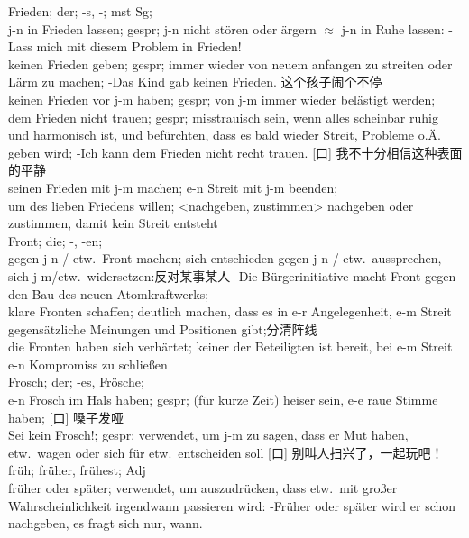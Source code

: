 \noindent
Frieden; der; -s, -; mst Sg; \\
j-n in Frieden lassen; gespr; j-n nicht st\"oren oder \"argern $\approx$ j-n in Ruhe lassen: -Lass mich mit diesem Problem in Frieden! \\
keinen Frieden geben; gespr; immer wieder von neuem anfangen zu streiten oder L\"arm zu machen; -Das Kind gab keinen Frieden. 这个孩子闹个不停\\
keinen Frieden vor j-m haben; gespr; von j-m immer wieder bel\"astigt werden;\\
dem Frieden nicht trauen; gespr; misstrauisch sein, wenn alles scheinbar ruhig und harmonisch ist, und bef\"urchten, dass es bald wieder Streit, Probleme o.\"A. geben wird; -Ich kann dem Frieden nicht recht trauen. [口] 我不十分相信这种表面的平静\\
seinen Frieden mit j-m machen; e-n Streit mit j-m beenden;\\
um des lieben Friedens willen; <nachgeben, zustimmen> nachgeben oder zustimmen, damit kein Streit entsteht \\

\noindent
Front; die; -, -en; \\
gegen j-n / etw.\ Front machen; sich entschieden gegen j-n / etw.\ aussprechen, sich j-m/etw.\ widersetzen:反对某事某人 -Die B\"urgerinitiative macht Front gegen den Bau des neuen Atomkraftwerks;\\
klare Fronten schaffen; deutlich machen, dass es in e-r Angelegenheit, e-m Streit gegens\"atzliche Meinungen und Positionen gibt;分清阵线\\
die Fronten haben sich verh\"artet; keiner der Beteiligten ist bereit, bei e-m Streit e-n Kompromiss zu schlie\ss{}en \\

\noindent
Frosch; der; -es, Fr\"osche; \\
e-n Frosch im Hals haben; gespr; (f\"ur kurze Zeit) heiser sein, e-e raue Stimme haben; [口] 嗓子发哑\\
Sei kein Frosch!; gespr; verwendet, um j-m zu sagen, dass er Mut haben, etw.\ wagen oder sich f\"ur etw.\ entscheiden soll [口] 别叫人扫兴了，一起玩吧！ \\

\noindent
fr\"uh; fr\"uher, fr\"uhest; Adj \\
fr\"uher oder sp\"ater; verwendet, um auszudr\"ucken, dass etw.\ mit gro\ss{}er Wahrscheinlichkeit irgendwann passieren wird: -Fr\"uher oder sp\"ater wird er schon nachgeben, es fragt sich nur, wann. 

